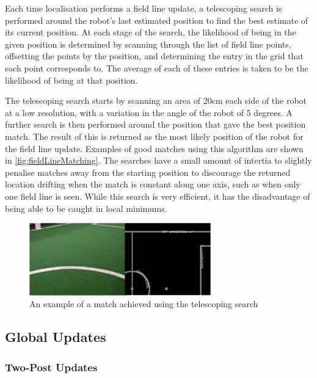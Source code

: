 \documentclass[pdftex,11pt,a4paper]{report}
\begin{document}
Each time localisation performs a field line update, a telescoping search is performed around the robot's last estimated position to find the best estimate of its current position. At each stage of the search, the likelihood of being in the given position is determined by scanning through the list of field line points, offsetting the points by the position, and determining the entry in the grid that each point corresponds to. The average of each of these entries is taken to be the likelihood of being at that position. 

The telescoping search starts by scanning an area of 20cm each side of the robot at a low resolution, with a variation in the angle of the robot of 5 degrees. A further search is then performed around the position that gave the best position match. The result of this is returned as the most likely position of the robot for the field line update. Examples of good matches using this algorithm are shown in \autoref{fig:fieldLineMatching}. The searches have a small amount of intertia to slightly penalise matches away from the starting position to discourage the returned location drifting when the match is constant along one axis, such as when only one field line is seen. While this search is very efficient, it has the disadvantage of being able to be caught in local minimums.

\begin{figure} [t]
\centering
\includegraphics[width=0.7\textwidth]{figures/fieldLineMatching.png}
\caption{An example of a match achieved using the telescoping search} \label{fig:fieldLineMatching}
\end{figure}

\subsection{Global Updates}

\subsubsection{Two-Post Updates} \label{subsubTwoPostUpdates}
\end{document}
